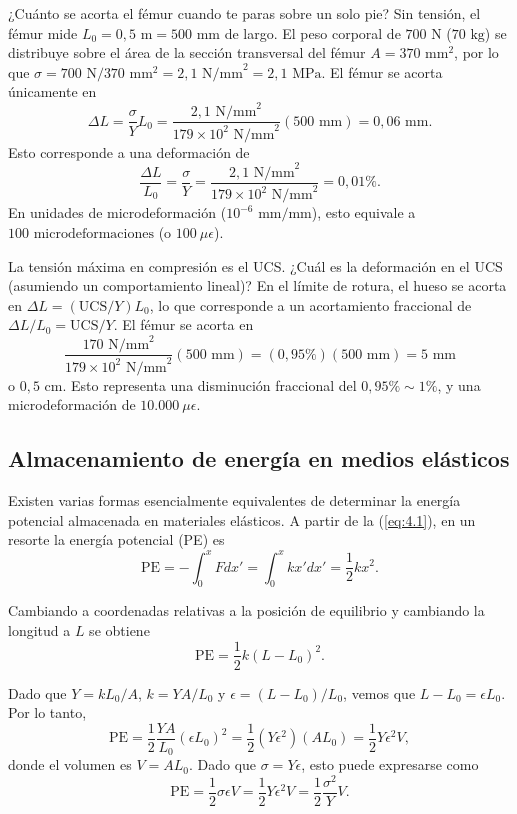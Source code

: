 \documentclass[12pt]{book}
\begin{document}
¿Cuánto se acorta el fémur cuando te paras sobre un solo pie? Sin tensión, el fémur mide $L_0 = 0,5\text{ m} = 500\text{ mm}$ de largo. El peso corporal de $700\text{ N}$ ($70\text{ kg}$) se distribuye sobre el área de la sección transversal del fémur $A = 370\text{ mm}^2$, por lo que $\sigma = 700\text{ N}/370\text{ mm}^2 = 2,1\text{ N/mm}^2 = 2,1\text{ MPa}$. El fémur se acorta únicamente en
\[ \Delta L = \frac{\sigma}{Y} L_0 = \frac{2,1\text{ N/mm}^2}{179 \times 10^2\text{ N/mm}^2} (500\text{ mm}) = 0,06\text{ mm}. \]
Esto corresponde a una deformación de
\[ \frac{\Delta L}{L_0} = \frac{\sigma}{Y} = \frac{2,1\text{ N/mm}^2}{179 \times 10^2\text{ N/mm}^2} = 0,01\%. \]
En unidades de microdeformación ($10^{-6}\text{ mm/mm}$), esto equivale a $100\text{ microdeformaciones}$ (o $100\ \mu\epsilon$).

La tensión máxima en compresión es el UCS. ¿Cuál es la deformación en el UCS (asumiendo un comportamiento lineal)? En el límite de rotura, el hueso se acorta en $\Delta L = (\text{UCS}/Y) L_0$, lo que corresponde a un acortamiento fraccional de $\Delta L/L_0 = \text{UCS}/Y$. El fémur se acorta en
\[ \frac{170\text{ N/mm}^2}{179 \times 10^2\text{ N/mm}^2} (500\text{ mm}) = (0,95\%) (500\text{ mm}) = 5\text{ mm} \]
o $0,5\text{ cm}$. Esto representa una disminución fraccional del $0,95\% \sim 1\%$, y una microdeformación de $10.000\ \mu\epsilon$.

\subsection{Almacenamiento de energía en medios elásticos}

Existen varias formas esencialmente equivalentes de determinar la energía potencial almacenada en materiales elásticos. A partir de la (\ref{eq:4.1}), en un resorte la energía potencial (PE) es
\begin{equation}
\text{PE} = -\int_0^x F dx' = \int_0^x kx' dx' = \frac{1}{2}kx^2.
\label{eq:4.11}
\end{equation}

Cambiando a coordenadas relativas a la posición de equilibrio y cambiando la longitud a $L$ se obtiene
\begin{equation}
\text{PE} = \frac{1}{2}k(L - L_0)^2.
\label{eq:4.12}
\end{equation}

Dado que $Y = kL_0/A$, $k = YA/L_0$ y $\epsilon = (L - L_0)/L_0$, vemos que $L - L_0 = \epsilon L_0$. Por lo tanto,
\begin{equation}
\text{PE} = \frac{1}{2}\frac{YA}{L_0} (\epsilon L_0)^2 = \frac{1}{2}(Y\epsilon^2)(AL_0) = \frac{1}{2}Y\epsilon^2 V,
\label{eq:4.13}
\end{equation}
donde el volumen es $V = A L_0$. Dado que $\sigma = Y\epsilon$, esto puede expresarse como
\begin{equation}
\text{PE} = \frac{1}{2}\sigma\epsilon V = \frac{1}{2}Y\epsilon^2 V = \frac{1}{2}\frac{\sigma^2}{Y} V.
\label{eq:4.14}
\end{equation}
\end{document}

